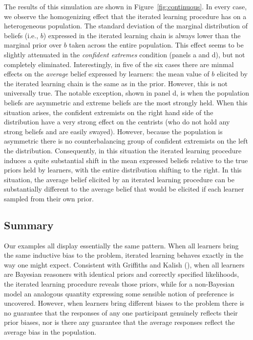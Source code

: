 \documentclass[doc]{apa6}
\begin{document}
The results of this simulation are shown in Figure~\ref{fig:continuous}. In every case, we observe the homogenizing effect that the iterated learning procedure has on a heterogeneous population. The standard deviation of the marginal distribution of beliefs (i.e., $b$) expressed in the iterated learning chain is always lower than the marginal prior over $b$ taken across the entire population. This effect seems to be slightly attenuated in the {\it confident extremes} condition (panels a and d), but not completely eliminated. Interestingly, in five of the six cases there are minmal effects on the {\it average} belief expressed by learners: the mean value of $b$ elicited by the iterated learning chain is the same as in the prior. However, this is not universally true. The notable exception, shown in panel d, is when the population beliefs are asymmetric and extreme beliefs are the most strongly held. When this situation arises, the confident extremists on the right hand side of the distribution have a very strong effect on the centrists (who do not hold any strong beliefs and are easily swayed). However, because the population is asymmetric there is no counterbalancing group of confident extremists on the left the distribution. Consequently, in this situation the iterated learning procedure induces a quite substantial shift in the mean expressed beliefs relative to the true priors held by learners, with the entire distribution shifting to the right. In this situation, the average belief elicited by an iterated learning procedure can be substantially different to the average belief that would be elicited if each learner sampled from their own prior.


\subsection{Summary}

Our examples all display essentially the same pattern. When all learners bring the same inductive bias to the problem, iterated learning behaves exactly in the way one might expect. Consistent with Griffiths and Kalish (\citeyear{griffiths_language_2007}), when all learners are Bayesian reasoners with identical priors and correctly specified likelihoods, the iterated learning procedure reveals those priors, while for a non-Bayesian model an analogous quantity expressing some sensible notion of preference is uncovered. However, when learners bring different biases to the problem there is no guarantee that the responses of any one participant genuinely reflects their prior biases, nor is there any guarantee that the average responses reflect the average bias in the population. 
\end{document}
